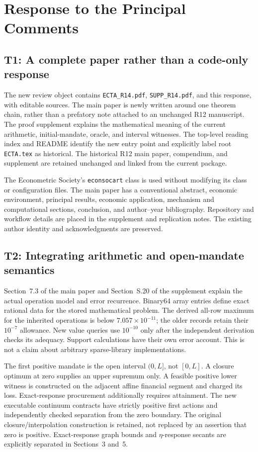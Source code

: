 \section{Response to the Principal Comments}
\subsection{T1: A complete paper rather than a code-only response}
The new review object contains \texttt{ECTA\_R14.pdf}, \texttt{SUPP\_R14.pdf}, and this response, with editable sources. The main paper is newly written around one theorem chain, rather than a prefatory note attached to an unchanged R12 manuscript. The proof supplement explains the mathematical meaning of the current arithmetic, initial-mandate, oracle, and interval witnesses. The top-level reading index and README identify the new entry point and explicitly label root \texttt{ECTA.tex} as historical. The historical R12 main paper, compendium, and supplement are retained unchanged and linked from the current package.

The Econometric Society's \texttt{econsocart} class is used without modifying its class or configuration files. The main paper has a conventional abstract, economic environment, principal results, economic application, mechanism and computational sections, conclusion, and author--year bibliography. Repository and workflow details are placed in the supplement and replication notes. The existing author identity and acknowledgments are preserved.

\subsection{T2: Integrating arithmetic and open-mandate semantics}
Section~7.3 of the main paper and Section~S.20 of the supplement explain the actual operation model and error recurrence. Binary64 array entries define exact rational data for the stored mathematical problem. The derived all-row maximum for the inherited operations is below $7.057\times10^{-11}$; the older records retain their $10^{-7}$ allowance. New value queries use $10^{-10}$ only after the independent derivation checks its adequacy. Support calculations have their own error account. This is not a claim about arbitrary sparse-library implementations.

The first positive mandate is the open interval $(0,L]$, not $[0,L]$. A closure optimum at zero supplies an upper supremum only. A feasible positive lower witness is constructed on the adjacent affine financial segment and charged its loss. Exact-response procurement additionally requires attainment. The new executable continuum contracts have strictly positive first actions and independently checked separation from the zero boundary. The original closure/interpolation construction is retained, not replaced by an assertion that zero is positive. Exact-response graph bounds and $\eta$-response secants are explicitly separated in Sections~3 and~5.


